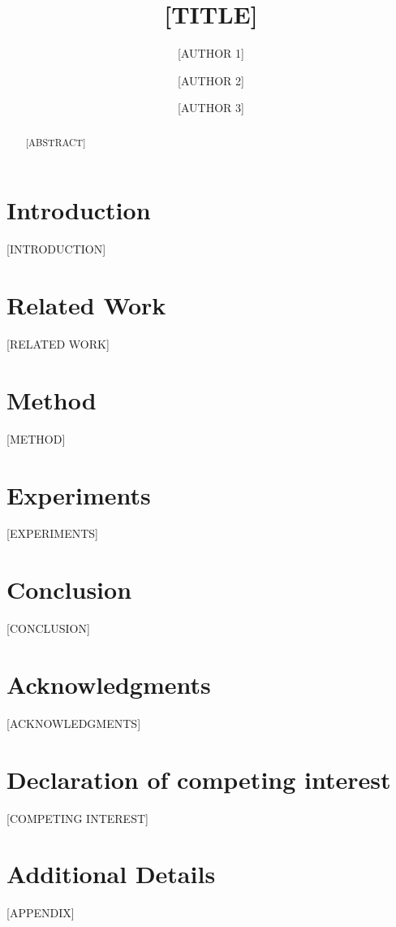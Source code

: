 \documentclass[preprint,12pt]{elsarticle}
\theoremstyle{plain}
\theoremstyle{definition}
\theoremstyle{remark}
\begin{document}
\begin{frontmatter}

\title{[TITLE]}

\author[inst1]{[AUTHOR 1]}
\author[inst1,inst2]{[AUTHOR 2]}
\author[inst2]{[AUTHOR 3]}


\begin{abstract}
[ABSTRACT]
\end{abstract}

\begin{highlights}
\item [HIGHLIGHT 1]
\item [HIGHLIGHT 2]
\item [HIGHLIGHT 3]
\end{highlights}

\begin{keywords}
[KEYWORDS]
\end{keywords}

\end{frontmatter}

\section{Introduction}
\label{sec:intro}
[INTRODUCTION]

\section{Related Work}
\label{sec:related}
[RELATED WORK]

\section{Method}
\label{sec:method}
[METHOD]

\section{Experiments}
\label{sec:experiments}
[EXPERIMENTS]

\section{Conclusion}
\label{sec:conclusion}
[CONCLUSION]

\section*{Acknowledgments}
[ACKNOWLEDGMENTS]

\section*{Declaration of competing interest}
[COMPETING INTEREST]




\appendix
\section{Additional Details}
[APPENDIX]
\end{document}
